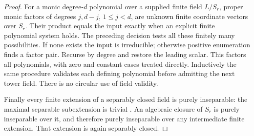 \begin{proof}
For a monic degree-$d$ polynomial
over a supplied finite field $L/S_r$,
proper monic factors of degrees
$j,d-j$, $1\le j<d$, are unknown
finite coordinate vectors over
$S_r$.  Their product equals the
input exactly when an explicit
finite polynomial system holds.
The preceding decision tests all
these finitely many possibilities.
If none exists the input is
irreducible; otherwise positive
enumeration finds a factor pair.
Recurse by degree and restore
the leading scalar.
This factors all polynomials,
with zero and constant cases
treated directly.
Inductively the same procedure
validates each defining polynomial
before admitting the next tower
field.  There is no circular use
of field validity.

Finally every finite extension
of a separably closed field is
purely inseparable: the maximal
separable subextension is trivial
\cite[Lemma 9.14.6, Tag 09HD]
{C-StacksSeparablyClosed}.
An algebraic closure of $S_r$
is purely inseparable over it,
and therefore purely inseparable
over any intermediate finite
extension.  That extension is
again separably closed.
\end{proof}

